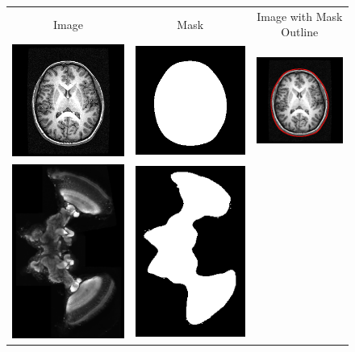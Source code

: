 \documentclass{InsightArticle}
\begin{document}
\begin{figure}[tbp]
\begin{center}
\begin{tabular}{ccc}
Image & Mask & Image with Mask Outline \\
\includegraphics[width=.3\linewidth]{img/levelset_spgr_spgr}&
\includegraphics[width=.3\linewidth]{img/levelset_spgr_mask}&
\includegraphics[width=.3\linewidth]{img/levelset_spgr_ovl} \\
\includegraphics[width=.3\linewidth]{img/levelset_locust_clsm}&
\includegraphics[width=.3\linewidth]{img/levelset_locust_mask}&

\end{tabular}
\end{center}
\end{figure}
\end{document}
